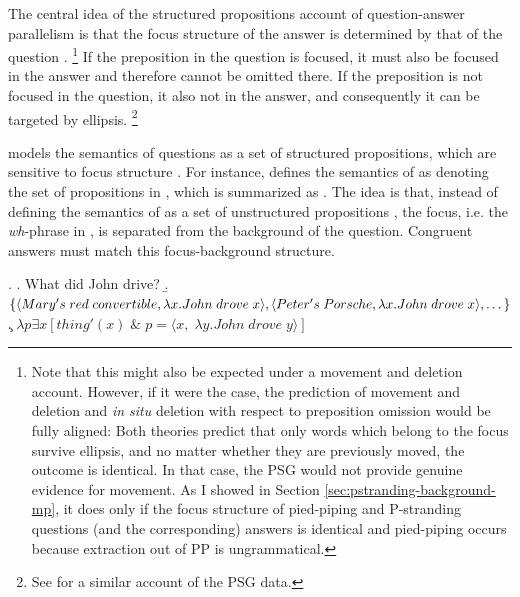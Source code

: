 The central idea of the structured propositions account of question-answer parallelism is that the focus structure of the answer is determined by that of the question \citep{reich2002, reich2002a, reich2007}.%
%
\footnote{Note that this might also be expected under a movement and deletion account. However, if it were the case, the prediction of movement and deletion and \textit{in situ} deletion with respect to preposition omission would be fully aligned: Both theories predict that only words which belong to the focus survive ellipsis, and no matter whether they are previously moved, the outcome is identical. In that case, the PSG would not provide genuine evidence for movement. As I showed in Section \ref{sec:pstranding-background-mp}, it does only if the focus structure of pied-piping and P-stranding questions (and the corresponding) answers is identical and pied-piping occurs because extraction out of PP is ungrammatical.}\afterfn%
%
If the preposition in the question is focused, it must also be focused in the answer and therefore cannot be omitted there. If the preposition is not focused in the question, it also not in the answer, and consequently it can be targeted by ellipsis.%
%
\footnote{See \citet{griffiths2019} for a similar account of the PSG data.}\afterfn%
%

\citet{reich2002a} models the semantics of questions as a set of structured propositions, which are sensitive to focus structure \citep{vonstechow1981}. For instance, \citet[82]{reich2002a} defines the semantics of \Next[a] as denoting the set of propositions in \Next[b], which is summarized as \Next[c]. The idea is that, instead of defining the semantics of \Next[a] as a set of unstructured propositions \NNext, the focus, i.e. the \textit{wh}-phrase in \Next, is separated from the background of the question. Congruent answers must match this focus-background structure.

\ex. \a. What did John drive? \hfill \citep[82]{reich2002a}
     \b. $\{\langle Mary's\;red\;convertible, \lambda x.John\;drove\;x \rangle,\\
     \langle Peter's\;Porsche, \lambda x.John\;drove\;x \rangle, \dots\}$
     \c. $\lambda p \exists x [thing'(x)\;\&\;p = \langle x,\;\lambda y.John\;drove\;y\rangle]$
     
